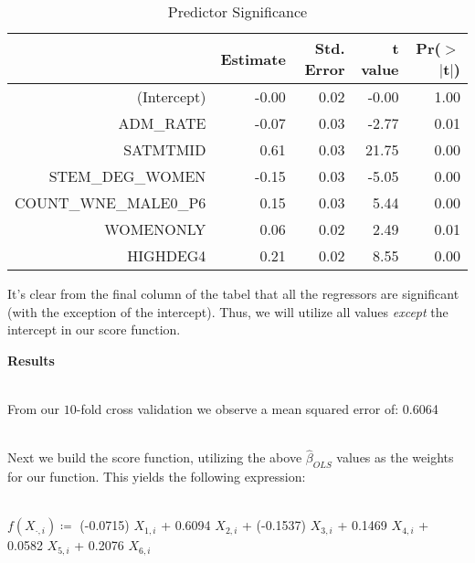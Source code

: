 \documentclass[11pt,english]{article}
\begin{document}
\begin{table}[ht]
\centering
\begin{tabular}{rrrrr}
  \hline
 & Estimate & Std. Error & t value & Pr($>$$|$t$|$) \\ 
  \hline
(Intercept) & -0.00 & 0.02 & -0.00 & 1.00 \\ 
  ADM\_RATE & -0.07 & 0.03 & -2.77 & 0.01 \\ 
  SATMTMID & 0.61 & 0.03 & 21.75 & 0.00 \\ 
  STEM\_DEG\_WOMEN & -0.15 & 0.03 & -5.05 & 0.00 \\ 
  COUNT\_WNE\_MALE0\_P6 & 0.15 & 0.03 & 5.44 & 0.00 \\ 
  WOMENONLY & 0.06 & 0.02 & 2.49 & 0.01 \\ 
  HIGHDEG4 & 0.21 & 0.02 & 8.55 & 0.00 \\ 
   \hline
\end{tabular}
\caption{Predictor Significance} 
\end{table}
It's clear from the final column of the tabel that all the regressors are significant (with the exception of the intercept). Thus, we will utilize all values \emph{except} the intercept in our score function. \\
\vspace*{3\baselineskip}


{\large\textbf{Results}} \\\

From our $10$-fold cross validation we observe a mean squared error of: 0.6064 \\\

Next we build the score function, utilizing the above $\hat{\beta}_{OLS}$ values as the weights for our function. This yields the following expression:\\\

$f(X_{\cdot,i}) \coloneqq $ (-0.0715)  $  X_{1,i}$ + 0.6094 $  X_{2,i}$ + (-0.1537) $  X_{3,i}$ + 0.1469 $  X_{4,i}$ + 0.0582 $  X_{5,i}$ + 0.2076 $  X_{6,i}$ \\\
\end{document}
